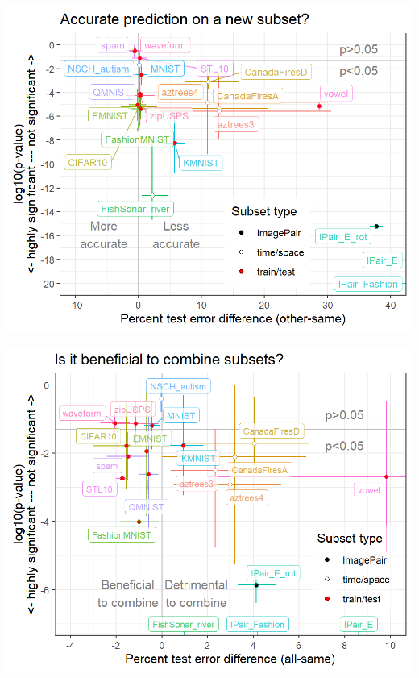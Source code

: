 \documentclass[t]{beamer}
\begin{document}
\begin{frame}
  \includegraphics[height=\textheight]{data_Classif_batchmark_registry_scatter_other_segments.png} 
\end{frame}
 
\begin{frame}
  \includegraphics[height=\textheight]{data_Classif_batchmark_registry_scatter_all_segments.png}
\end{frame}
 
\end{document}
